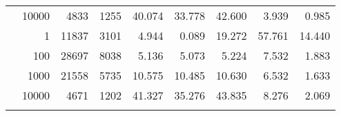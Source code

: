 \begin{table}
\begin{tabular}{rrrrrrrrr}
	            
					 &  
					 
					\multirow{ 1 }{*}{ 10000 } &
					
						
							    
							     4833  & 1255  
	                           & 40.074 & 33.778 & 42.600
	                           & 3.939 & 0.985  \\
	                
	            
	        
				\noalign{\smallskip}\hline
				\multirow{ 4 }{*}{ 500000 } &
				
					
					 
					\multirow{ 1 }{*}{ 1 } &
					
						
							    
							     11837  & 3101  
	                           & 4.944 & 0.089 & 19.272
	                           & 57.761 & 14.440  \\
	                
	            
					 &  
					 
					\multirow{ 1 }{*}{ 100 } &
					
						
							    
							     28697  & 8038  
	                           & 5.136 & 5.073 & 5.224
	                           & 7.532 & 1.883  \\
	                
	            
					 &  
					 
					\multirow{ 1 }{*}{ 1000 } &
					
						
							    
							     21558  & 5735  
	                           & 10.575 & 10.485 & 10.630
	                           & 6.532 & 1.633  \\
	                
	            
					 &  
					 
					\multirow{ 1 }{*}{ 10000 } &
					
						
							    
							     4671  & 1202  
	                           & 41.327 & 35.276 & 43.835
	                           & 8.276 & 2.069  \\
	                
	            
	        
				\noalign{\smallskip}\hline
				\multirow{ 4 }{*}{ 1000000 } &
				

\end{tabular}
\end{table}
